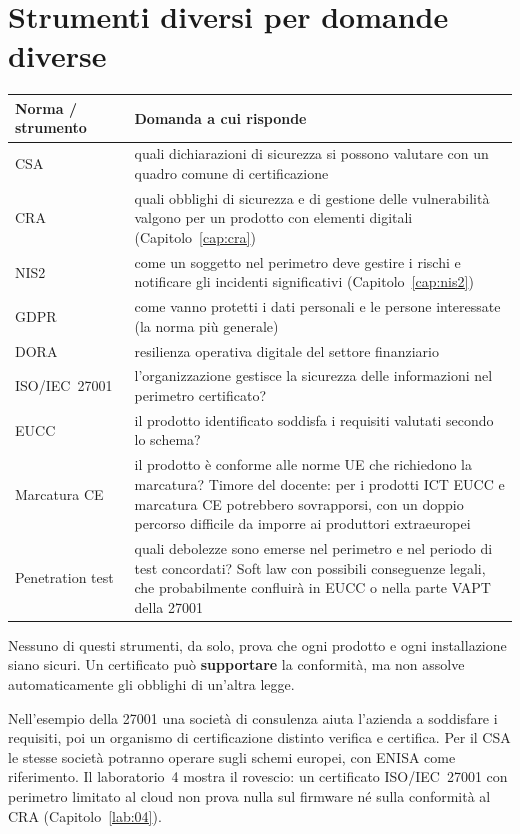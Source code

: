 \section{Strumenti diversi per domande diverse}
\label{sec:csa-rapporti}

\begin{center}
\small
\begin{tabularx}{\linewidth}{>{\raggedright\arraybackslash}p{3.4cm} X}
\toprule
\textbf{Norma / strumento} & \textbf{Domanda a cui risponde}\\
\midrule
CSA & quali dichiarazioni di sicurezza si possono valutare con un quadro comune di certificazione\\
CRA & quali obblighi di sicurezza e di gestione delle vulnerabilità valgono per un prodotto con elementi
  digitali (Capitolo~\ref{cap:cra})\\
NIS2 & come un soggetto nel perimetro deve gestire i rischi e notificare gli incidenti significativi
  (Capitolo~\ref{cap:nis2})\\
GDPR & come vanno protetti i dati personali e le persone interessate (la norma più generale)\\
DORA & resilienza operativa digitale del settore finanziario\\
ISO/IEC~27001 & l'organizzazione gestisce la sicurezza delle informazioni nel perimetro certificato?\\
EUCC & il prodotto identificato soddisfa i requisiti valutati secondo lo schema?\\
Marcatura CE & il prodotto è conforme alle norme UE che richiedono la marcatura? Timore del docente: per i
  prodotti ICT EUCC e marcatura CE potrebbero sovrapporsi, con un doppio percorso difficile da imporre
  ai produttori extraeuropei\\
Penetration test & quali debolezze sono emerse nel perimetro e nel periodo di test concordati? Soft law con possibili conseguenze legali, che
  probabilmente confluirà in EUCC o nella parte VAPT della 27001\\
\bottomrule
\end{tabularx}
\end{center}
Nessuno di questi strumenti, da solo, prova che ogni prodotto e ogni installazione siano sicuri. Un
certificato può \textbf{supportare} la conformità, ma non assolve automaticamente gli obblighi di un'altra
legge.

\begin{nota}
Nell'esempio della 27001 una società di consulenza aiuta l'azienda a soddisfare i requisiti, poi un
organismo di certificazione distinto verifica e certifica. Per il CSA le stesse società potranno operare
sugli schemi europei, con ENISA come riferimento. Il laboratorio~4 mostra il rovescio: un certificato
ISO/IEC~27001 con perimetro limitato al cloud non prova nulla sul firmware né sulla conformità al CRA
(Capitolo~\ref{lab:04}).
\end{nota}


